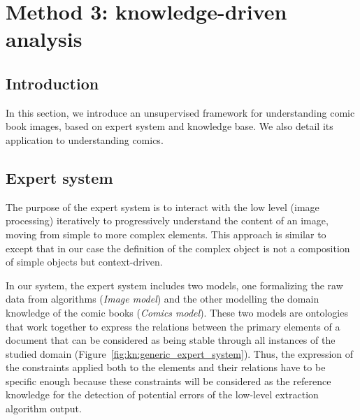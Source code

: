 \chapter{Method 3: knowledge-driven analysis}
\label{chap:knowledge}
\graphicspath{{./chapters/5-knowledge/figs/}}

\section{Introduction}
\label{sec:kn:introduction}

In this section, we introduce an unsupervised framework for understanding comic book images, based on expert system and knowledge base.
We also detail its application to understanding comics.


\section{Expert system} %
\label{sec:kn:expert_system}

The purpose of the expert system is to interact with the low level (image processing) iteratively to progressively understand the content of an image, moving from simple to more complex elements.
This approach is similar to~\cite{Sciascio2011Structured} except that in our case the definition of the complex object is not a composition of simple objects but context-driven.

In our system, the expert system includes two models, one formalizing the raw data from algorithms (\emph{Image model}) and the other modelling the domain knowledge of the comic books (\emph{Comics model}).
These two models are ontologies that work together to
express the relations between the primary elements of a document that can be considered as being stable through all instances of the studied domain (Figure~\ref{fig:kn:generic_expert_system}).
Thus, the expression of the constraints applied both to the elements and their relations have to be specific enough because these constraints will be considered as the reference knowledge for the detection of potential errors of the low-level extraction algorithm output.


